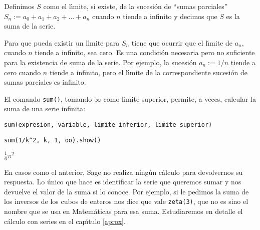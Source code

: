 Definimos $S$ como el l\'{\i}mite, si existe, de la sucesi\'on de ``sumas
parciales'' $S_n:=a_0+a_1+a_2+\dots+a_n$ cuando $n$ tiende a infinito y decimos
que $S$ es la suma de la serie. 

Para que pueda existir un l\'{\i}mite para $S_n$ tiene que ocurrir que el
l\'{\i}mite de $a_n$, cuando $n$ tiende a infinito, sea cero. Es una condici\'on
necesaria pero {\sc no suficiente} para la existencia de suma de la serie. Por
ejemplo, la sucesi\'on $a_n:=1/n$ tiende a cero cuando $n$ tiende a infinito,
pero  el l\'{\i}mite de la correspondiente sucesi\'on de sumas parciales es
infinito. 


El comando \lstinline|sum()|, tomando $\infty$ como l\'{\i}mite superior,
permite, a veces, 
calcular la suma de una serie infinita:
\begin{lstlisting}[columns=fullflexible,backgroundcolor=\color{white}]
sum(expresion, variable, limite_inferior, limite_superior)
\end{lstlisting}

\begin{lstlisting}
sum(1/k^2, k, 1, oo).show()
\end{lstlisting}
\begin{Output}
	$\frac16\pi^2$
\end{Output}

En casos como el anterior, Sage no realiza ning\'un c\'alculo para devolvernos
su respuesta. Lo \'unico que hace es identificar la serie que queremos sumar y
nos devuelve el valor de la suma si lo conoce. Por ejemplo, si le pedimos la
suma de los inversos de los cubos de enteros nos dice que vale
\lstinline|zeta(3)|, que no es sino el nombre que se usa en Matem\'aticas para
esa suma. Estudiaremos en detalle el c\'alculo con series en el cap\'{\i}tulo
\ref{aprox}. 









